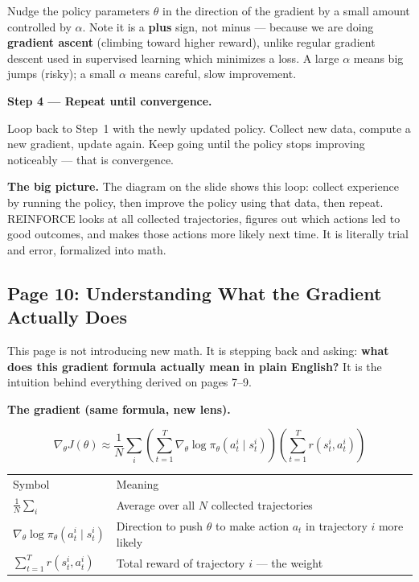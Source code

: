 \medskip
Nudge the policy parameters $\theta$ in the direction of the gradient by a small amount
controlled by $\alpha$. Note it is a \textbf{plus} sign, not minus --- because we are doing
\textbf{gradient ascent} (climbing toward higher reward), unlike regular gradient descent used
in supervised learning which minimizes a loss. A large $\alpha$ means big jumps (risky); a
small $\alpha$ means careful, slow improvement.

\medskip
\textbf{Step 4 --- Repeat until convergence.}

Loop back to Step~1 with the newly updated policy. Collect new data, compute a new gradient,
update again. Keep going until the policy stops improving noticeably --- that is convergence.

\medskip
\textbf{The big picture.} The diagram on the slide shows this loop: collect experience by
running the policy, then improve the policy using that data, then repeat. REINFORCE looks at
all collected trajectories, figures out which actions led to good outcomes, and makes those
actions more likely next time. It is literally trial and error, formalized into math.


\subsection{Page 10: Understanding What the Gradient Actually Does}

This page is not introducing new math. It is stepping back and asking: \textbf{what does this
gradient formula actually mean in plain English?} It is the intuition behind everything derived
on pages 7--9.

\medskip
\textbf{The gradient (same formula, new lens).}

\[
  \nabla_\theta J(\theta)
  \approx \frac{1}{N}\sum_i
    \left(\sum_{t=1}^T\nabla_\theta\log\pi_\theta(a_t^i\mid s_t^i)\right)
    \left(\sum_{t=1}^T r(s_t^i,a_t^i)\right)
\]

\begin{tabular}{ll}
  Symbol & Meaning \\[4pt]
  $\frac{1}{N}\sum_i$ & Average over all $N$ collected trajectories \\
  $\nabla_\theta\log\pi_\theta(a_t^i\mid s_t^i)$ & Direction to push $\theta$ to make action $a_t$ in trajectory $i$ more likely \\
  $\sum_{t=1}^T r(s_t^i,a_t^i)$ & Total reward of trajectory $i$ --- the weight \\
\end{tabular}

